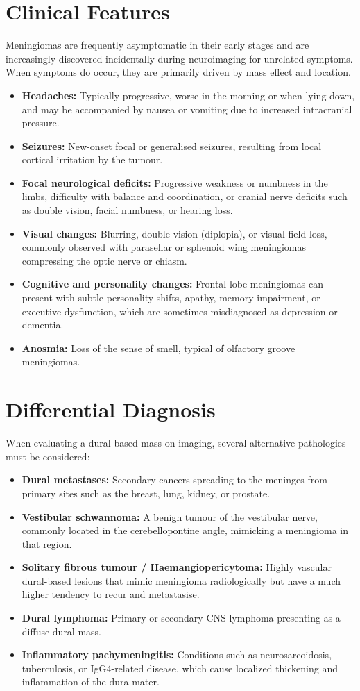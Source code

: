 \section*{Clinical Features}
Meningiomas are frequently asymptomatic in their early stages and are increasingly discovered incidentally during neuroimaging for unrelated symptoms. When symptoms do occur, they are primarily driven by mass effect and location.
\begin{itemize}
    \item \textbf{Headaches:} Typically progressive, worse in the morning or when lying down, and may be accompanied by nausea or vomiting due to increased intracranial pressure.
    \item \textbf{Seizures:} New-onset focal or generalised seizures, resulting from local cortical irritation by the tumour.
    \item \textbf{Focal neurological deficits:} Progressive weakness or numbness in the limbs, difficulty with balance and coordination, or cranial nerve deficits such as double vision, facial numbness, or hearing loss.
    \item \textbf{Visual changes:} Blurring, double vision (diplopia), or visual field loss, commonly observed with parasellar or sphenoid wing meningiomas compressing the optic nerve or chiasm.
    \item \textbf{Cognitive and personality changes:} Frontal lobe meningiomas can present with subtle personality shifts, apathy, memory impairment, or executive dysfunction, which are sometimes misdiagnosed as depression or dementia.
    \item \textbf{Anosmia:} Loss of the sense of smell, typical of olfactory groove meningiomas.
\end{itemize}

\section*{Differential Diagnosis}
When evaluating a dural-based mass on imaging, several alternative pathologies must be considered:
\begin{itemize}
    \item \textbf{Dural metastases:} Secondary cancers spreading to the meninges from primary sites such as the breast, lung, kidney, or prostate.
    \item \textbf{Vestibular schwannoma:} A benign tumour of the vestibular nerve, commonly located in the cerebellopontine angle, mimicking a meningioma in that region.
    \item \textbf{Solitary fibrous tumour / Haemangiopericytoma:} Highly vascular dural-based lesions that mimic meningioma radiologically but have a much higher tendency to recur and metastasise.
    \item \textbf{Dural lymphoma:} Primary or secondary CNS lymphoma presenting as a diffuse dural mass.
    \item \textbf{Inflammatory pachymeningitis:} Conditions such as neurosarcoidosis, tuberculosis, or IgG4-related disease, which cause localized thickening and inflammation of the dura mater.
\end{itemize}

